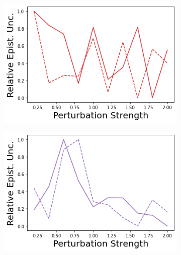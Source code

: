 \begin{figure}
    \begin{subfigure}{.24\textwidth}
        \includegraphics[width=\textwidth]{sections/011_icml2022/resources/action_shift-DropOut-AcrobotShift-v0-mean_epistemic_uncertainty_.png}
    \end{subfigure}
    \begin{subfigure}{.24\textwidth}
        \includegraphics[width=\textwidth]{sections/011_icml2022/resources/action_shift-Ensemble-AcrobotShift-v0-mean_epistemic_uncertainty_.png}
    \end{subfigure}
    \begin{subfigure}{.24\textwidth}

\end{subfigure}
\end{figure}
